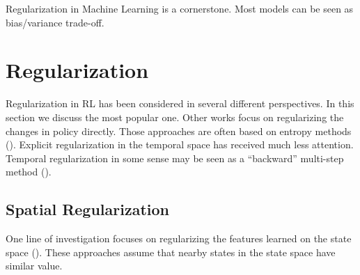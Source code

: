 Regularization in Machine Learning is a cornerstone. Most models can be seen as bias/variance trade-off.
\section{Regularization}
Regularization in RL has been considered in several different perspectives. In this section we discuss the most popular one. Other works focus on regularizing the changes in policy directly. Those approaches are often based on entropy methods (\cite{neu2017unified,schulman2017proximal,bartlett2009regal}).
Explicit regularization in the temporal space has received much less attention.
Temporal regularization in some sense may be seen as a ``backward'' multi-step method (\cite{sutton1998reinforcement}). 
\subsection{Spatial Regularization}
 One line of investigation focuses on regularizing the features learned on the state space (\cite{massoud2009regularized,petrik2010feature,pazis2011non,farahmand2011regularization,liu2012regularized,harrigan2016deep}). These approaches assume that nearby states in the state space have similar value.


